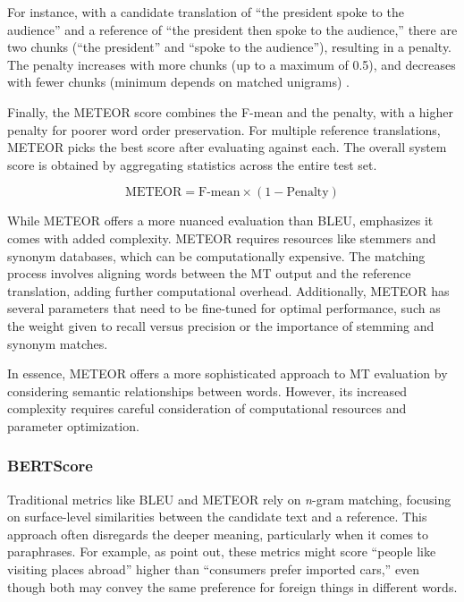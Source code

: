 {{For instance, with a candidate translation of ``the president spoke to the audience'' and a reference of ``the president then spoke to the audience,'' there are two chunks (``the president'' and ``spoke to the audience''), resulting in a penalty. The penalty increases with more chunks (up to a maximum of 0.5), and decreases with fewer chunks (minimum depends on matched unigrams) \parencite[68]{banerjee-lavie-2005-meteor}.

Finally, the METEOR score combines the F-mean and the penalty, with a higher penalty for poorer word order preservation. For multiple reference translations, METEOR picks the best score after evaluating against each. The overall system score is obtained by aggregating statistics across the entire test set.

\begin{equation}
\text{METEOR} = \text{F-mean} \times (1 - \text{Penalty})
\end{equation} 

While METEOR offers a more nuanced evaluation than BLEU, \textcite{koehn2020neural} emphasizes it comes with added complexity. METEOR requires resources like stemmers and synonym databases, which can be computationally expensive. The matching process involves aligning words between the MT output and the reference translation, adding further computational overhead. Additionally, METEOR has several parameters that need to be fine-tuned for optimal performance, such as the weight given to recall versus precision or the importance of stemming and synonym matches.

In essence, METEOR offers a more sophisticated approach to MT evaluation by considering semantic relationships between words. However, its increased complexity requires careful consideration of computational resources and parameter optimization.


\subsubsection{BERTScore}

Traditional metrics like BLEU and METEOR rely on \emph{n}-gram matching, focusing on surface-level similarities between the candidate text and a reference. This approach often disregards the deeper meaning, particularly when it comes to paraphrases. For example, as \textcite{saadany-orasan-2021-bleu} point out, these metrics might score ``people like visiting places abroad'' higher than ``consumers prefer imported cars,'' even though both may convey the same preference for foreign things in different words.

}}
